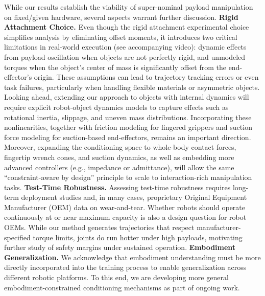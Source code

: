 While our results establish the viability of super-nominal payload manipulation on fixed/given hardware, several aspects warrant further discussion. \textbf{Rigid Attachment Choice.} Even though the rigid attachment experimental choice simplifies analysis by eliminating offset moments, it introduces two critical limitations in real-world execution (see accompanying video): dynamic effects from payload oscillation when objects are not perfectly rigid, and unmodeled torques when the object's center of mass is significantly offset from the end-effector's origin. These assumptions can lead to trajectory tracking errors or even task failures, particularly when handling flexible materials or asymmetric objects. Looking ahead, extending our approach to objects with internal dynamics will require explicit robot-object dynamics models to capture effects such as rotational inertia, slippage, and uneven mass distributions. Incorporating these nonlinearities, together with friction modeling for fingered grippers and suction force modeling for suction-based end-effectors, remains an important direction. Moreover, expanding the conditioning space to whole-body contact forces, fingertip wrench cones, and suction dynamics, as well as embedding more advanced controllers (e.g., impedance or admittance), will allow the same ``constraint-aware by design'' principle to scale to interaction-rich manipulation tasks. \textbf{Test-Time Robustness.} Assessing test-time robustness requires long-term deployment studies and, in many cases, proprietary Original Equipment Manufacturer (OEM) data on wear-and-tear. Whether robots should operate continuously at or near maximum capacity is also a design question for robot OEMs. While our method generates trajectories that respect manufacturer-specified torque limits, joints do run hotter under high payloads, motivating further study of safety margins under sustained operation. \textbf{Embodiment Generalization.} We acknowledge that embodiment understanding must be more directly incorporated into the training process to enable generalization across different robotic platforms. To this end, we are developing more general embodiment-constrained conditioning mechanisms as part of ongoing work.


